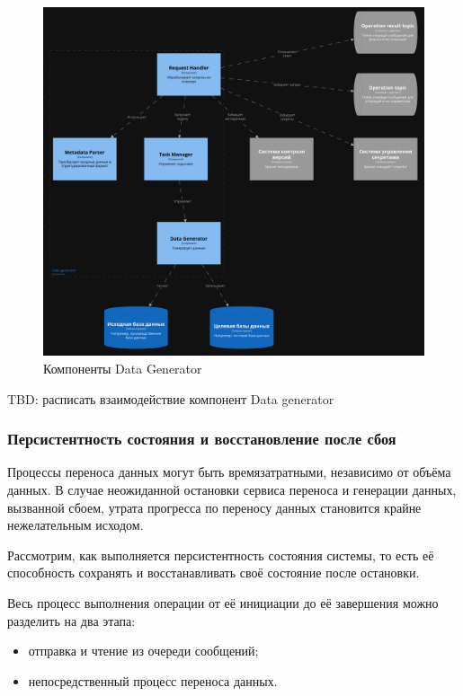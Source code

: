 \begin{figure}
  \includegraphics[scale=0.15]{./img/structurizr-DataGeneratorComponents.png}
  \caption{Компоненты Data Generator}
  \label{Data Generator Components}
\end{figure}

TBD: расписать взаимодействие компонент Data generator

\subsubsection{Персистентность состояния и восстановление после сбоя}

Процессы переноса данных могут быть времязатратными, независимо от объёма данных. В случае неожиданной остановки сервиса переноса и генерации данных, вызванной сбоем, утрата прогресса по переносу данных становится крайне нежелательным исходом.

Рассмотрим, как выполняется персистентность состояния системы, то есть её способность сохранять и восстанавливать своё состояние после остановки.

Весь процесс выполнения операции от её инициации до её завершения можно разделить на два этапа:
\begin{itemize}
  \item отправка и чтение из очереди сообщений;
  \item непосредственный процесс переноса данных.
\end{itemize}

